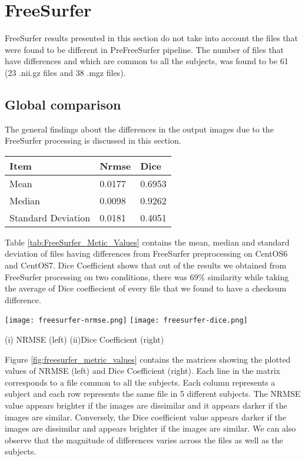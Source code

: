 \section{FreeSurfer} \label{sec:Freesurfer}
FreeSurfer results presented in this section do not take into account the files that were found to be different in PreFreeSurfer pipeline. The number of files that have differences and which are common to all the subjects, was found to be 61 (23 .nii.gz files and 38 .mgz files).

\subsection{Global comparison}
The general findings about the differences in the output images due to the FreeSurfer processing is discussed in this section.

\begin{center}
\begin{tabular}{|l|l|l|}
\hline
\textbf{Item}      & \textbf{Nrmse} & \textbf{Dice} \\ \hline
Mean               & 0.0177    & 0.6953  \\ \hline
Median             & 0.0098    & 0.9262   \\ \hline
Standard Deviation & 0.0181     & 0.4051   \\ \hline
\end{tabular}
\label{tab:FreeSurfer_Metic_Values}
\end{center}

Table \ref{tab:FreeSurfer_Metic_Values} contains the mean, median and standard deviation of files having differences from FreeSurfer preprocessing on CentOS6 and CentOS7. Dice Coefficient shows that out of the results we obtained from FreeSurfer processing on two conditions, there was 69\% similarity while taking the average of Dice coeffiecient of every file that we found to have a checksum difference.
\begin{center}
\texttt{[image: freesurfer-nrmse.png]}%
\texttt{[image: freesurfer-dice.png]}
\caption*{(i) NRMSE (left) (ii)Dice Coefficient (right)}
\label{fig:freesurfer_metric_values}
\end{center}

Figure \ref{fig:freesurfer_metric_values} contains the matrices showing the plotted values of NRMSE (left) and Dice Coefficient (right). Each line in the matrix corresponds to a file common to all the subjects. Each column represents a subject and each row represents the same file in 5 different subjects. The NRMSE value appears brighter if the images are dissimilar and it appears darker if the images are similar. Conversely, the Dice coefficient value appears darker if the images are dissimilar and appears brighter if the images are similar. We can also observe that the magnitude of differences varies across the files as well as the subjects.

